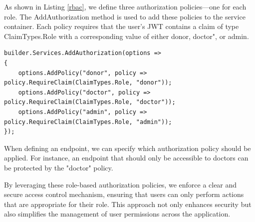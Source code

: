 As shown in Listing \ref{rbac}, we define three authorization policies—one for each role. The AddAuthorization method is used to add these policies to the service container. Each policy requires that the user’s JWT contains a claim of type ClaimTypes.Role with a corresponding value of either donor, doctor", or admin.

\begin{lstlisting}[style=sharpc, caption={Configuring Role-Based Authorization Policies in ASP.NET Core: Defining Access Control for Donor, Doctor, and Admin Roles.}, label={rbac}] 
builder.Services.AddAuthorization(options =>
{
	options.AddPolicy("donor", policy => policy.RequireClaim(ClaimTypes.Role, "donor"));
	options.AddPolicy("doctor", policy => policy.RequireClaim(ClaimTypes.Role, "doctor"));
	options.AddPolicy("admin", policy => policy.RequireClaim(ClaimTypes.Role, "admin"));
});
\end{lstlisting}

When defining an endpoint, we can specify which authorization policy should be applied. For instance, an endpoint that should only be accessible to doctors can be protected by the "doctor" policy.

By leveraging these role-based authorization policies, we enforce a clear and secure access control mechanism, ensuring that users can only perform actions that are appropriate for their role. This approach not only enhances security but also simplifies the management of user permissions across the application.

%
%
\newpage
